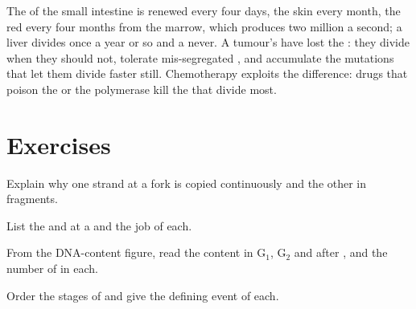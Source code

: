 \begin{example}[Turnover]\label{ex:b1:replication-mitosis:turnover}
The  of the small intestine is renewed every four days,
the skin every month, the red  every four months from the marrow,
which produces two million a second; a liver  divides once a year
or so and a  never. A tumour's  have lost the :
they divide when they should not, tolerate mis-segregated ,
and accumulate the mutations that let them divide faster still.
Chemotherapy exploits the difference: drugs that poison the  or
the polymerase kill the  that divide most.
\end{example}

\section{Exercises}

\begin{exercise}[$\star$]\label{exo:b1:replication-mitosis:1}
Explain why one strand at a fork is copied continuously and the other
in fragments.
\end{exercise}

\begin{exercise}[$\star$]\label{exo:b1:replication-mitosis:2}
List the  and  at a  and the job of
each.
\end{exercise}

\begin{exercise}[$\star$]\label{exo:b1:replication-mitosis:3}
From the DNA-content figure, read the  content in G$_1$, G$_2$ and
after , and the number of  in each.
\end{exercise}

\begin{exercise}[$\star$]\label{exo:b1:replication-mitosis:4}
Order the stages of  and give the defining event of each.
\end{exercise}

